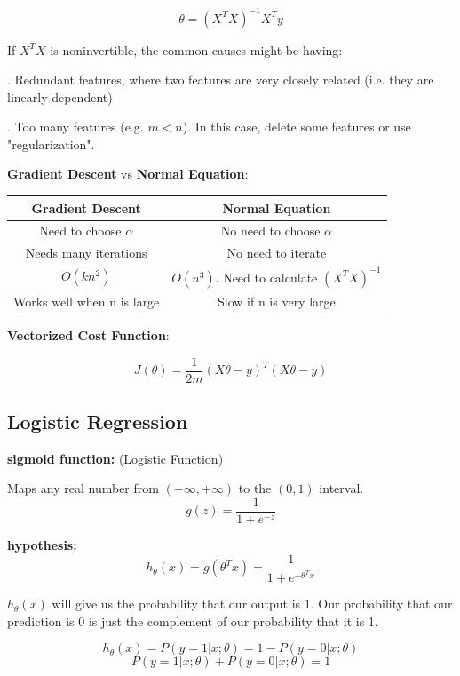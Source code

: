 \documentclass{article}
\begin{document}
\[
\theta = (X^TX)^{-1}X^Ty
\]

\noindent If \(X^TX\) is noninvertible, the common causes might be having:

. Redundant features, where two features are very closely related (i.e. they are linearly dependent)

. Too many features (e.g. \(m < n\)). In this case, delete some features or use "regularization".

\bigskip

\noindent \textbf{Gradient Descent} vs \textbf{Normal Equation}:

\begin{center}
\begin{tabular}{ | c | c | } 
\hline
\textbf{Gradient Descent} & \textbf{Normal Equation} \\ 
\hline
Need to choose \(\alpha\) & No need to choose \(\alpha\) \\ 
\hline
Needs many iterations & No need to iterate \\ 
\hline
\(O(kn^2)\) & \(O(n^3)\). Need to calculate \((X^TX)^{-1}\) \\ 
\hline
Works well when n is large & Slow if n is very large \\ 
\hline
\end{tabular}
\end{center}

\noindent \textbf{Vectorized Cost Function}:

\[J(\theta) = \frac{1}{2m} (X\theta - y)^T(X\theta - y)\]

\subsection{Logistic Regression}

\noindent \textbf{sigmoid function:} (Logistic Function)

\noindent Maps any real number from \((-\infty, +\infty)\) to the \((0, 1)\) interval.
\[g(z) = \frac{1}{1 + e^{-z}}\]

\noindent \textbf{hypothesis:}
\[
h_{\theta}(x) 
= g(\theta^T x)
= \frac{1}{1 + e^{-\theta^T x}}
\]

\noindent \(h_{\theta}(x)\) will give us the probability that our output is 1. Our probability that our prediction is 0 is just the complement of our probability that it is 1.

\[
h_{\theta} (x) 
= P(y = 1 | x ; \theta)
= 1 - P(y = 0 | x ; \theta)
\]
\[P(y = 1 | x ; \theta) + P(y = 0 | x ; \theta) = 1\]
\end{document}
